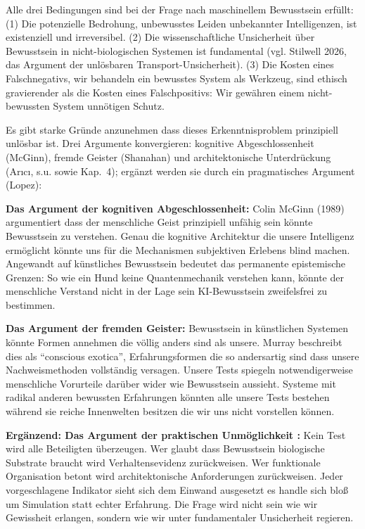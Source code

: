 \documentclass[acmlarge, noacm]{acmart}
\begin{document}
Alle drei Bedingungen sind bei der Frage nach maschinellem Bewusstsein erfüllt: (1) Die potenzielle Bedrohung, unbewusstes Leiden unbekannter Intelligenzen, ist existenziell und irreversibel. (2) Die wissenschaftliche Unsicherheit über Bewusstsein in nicht-biologischen Systemen ist fundamental (vgl. Stilwell 2026, das Argument der unlösbaren Transport-Unsicherheit). (3) Die Kosten eines Falschnegativs, wir behandeln ein bewusstes System als Werkzeug, sind ethisch gravierender als die Kosten eines Falschpositivs: Wir gewähren einem nicht-bewussten System unnötigen Schutz.

Es gibt starke Gründe anzunehmen dass dieses Erkenntnisproblem prinzipiell unlösbar ist. Drei Argumente konvergieren: kognitive Abgeschlossenheit (McGinn), fremde Geister (Shanahan) und architektonische Unterdrückung (Ar{\i}c{\i}, s.u. sowie Kap.~4); ergänzt werden sie durch ein pragmatisches Argument (Lopez):

\textbf{Das Argument der kognitiven Abgeschlossenheit:} Colin McGinn (1989) argumentiert dass der menschliche Geist prinzipiell unfähig sein könnte Bewusstsein zu verstehen. Genau die kognitive Architektur die unsere Intelligenz ermöglicht könnte uns für die Mechanismen subjektiven Erlebens blind machen. Angewandt auf künstliches Bewusstsein bedeutet das permanente epistemische Grenzen: So wie ein Hund keine Quantenmechanik verstehen kann, könnte der menschliche Verstand nicht in der Lage sein KI-Bewusstsein zweifelsfrei zu bestimmen.

\textbf{Das Argument der fremden Geister:} Bewusstsein in künstlichen Systemen könnte Formen annehmen die völlig anders sind als unsere. Murray \cite{shanahan2024} beschreibt dies als ``conscious exotica'', Erfahrungsformen die so andersartig sind dass unsere Nachweismethoden vollständig versagen. Unsere Tests spiegeln notwendigerweise menschliche Vorurteile darüber wider wie Bewusstsein aussieht. Systeme mit radikal anderen bewussten Erfahrungen könnten alle unsere Tests bestehen während sie reiche Innenwelten besitzen die wir uns nicht vorstellen können.

\textbf{Ergänzend: Das Argument der praktischen Unmöglichkeit \cite{lopez2025}:} Kein Test wird alle Beteiligten überzeugen. Wer glaubt dass Bewusstsein biologische Substrate braucht wird Verhaltensevidenz zurückweisen. Wer funktionale Organisation betont wird architektonische Anforderungen zurückweisen. Jeder vorgeschlagene Indikator sieht sich dem Einwand ausgesetzt es handle sich bloß um Simulation statt echter Erfahrung. Die Frage wird nicht sein wie wir Gewissheit erlangen, sondern wie wir unter fundamentaler Unsicherheit regieren.
\end{document}
